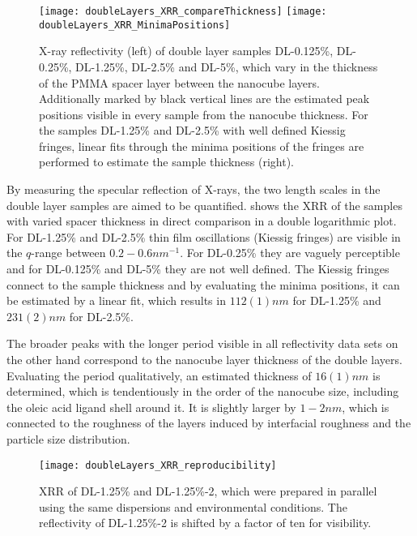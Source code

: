 \documentclass[\main/dresen_thesis.tex]{subfiles}
\begin{document}
  \label{sec:doublelayers:layers:pnr}
  \begin{figure}[tb]
    \centering
    \texttt{[image: doubleLayers\_XRR\_compareThickness]}
    \texttt{[image: doubleLayers\_XRR\_MinimaPositions]}
    \caption{\label{fig:doublelayers:xrr:thicknessComparison}X-ray reflectivity (left) of double layer samples DL-0.125\%, DL-0.25\%, DL-1.25\%, DL-2.5\% and DL-5\%, which vary in the thickness of the PMMA spacer layer between the nanocube layers. Additionally marked by black vertical lines are the estimated peak positions visible in every sample from the nanocube thickness. For the samples DL-1.25\% and DL-2.5\% with well defined Kiessig fringes, linear fits through the minima positions of the fringes are performed to estimate the sample thickness (right).}
  \end{figure}
  By measuring the specular reflection of X-rays, the two length scales in the double layer samples are aimed to be quantified.
   shows the XRR of the samples with varied spacer thickness in direct comparison in a double logarithmic plot.
  For DL-1.25\% and DL-2.5\% thin film oscillations (Kiessig fringes) are visible in the $q$-range between $0.2 - 0.6 \unit{nm^{-1}}$.
  For DL-0.25\% they are vaguely perceptible and for DL-0.125\% and DL-5\% they are not well defined.
  The Kiessig fringes connect to the sample thickness and by evaluating the minima positions, it can be estimated by a linear fit, which results in $112(1) \unit{nm}$ for DL-1.25\% and $231(2) \unit{nm}$ for DL-2.5\%.

  The broader peaks with the longer period visible in all reflectivity data sets on the other hand correspond to the nanocube layer thickness of the double layers.
  Evaluating the period qualitatively, an estimated thickness of $16(1) \unit{nm}$ is determined, which is tendentiously in the order of the nanocube size, including the oleic acid ligand shell around it.
  It is slightly larger by $1 - 2 \unit{nm}$, which is connected to the roughness of the layers induced by interfacial roughness and the particle size distribution.

  \begin{figure}[tb]
    \centering
    \texttt{[image: doubleLayers\_XRR\_reproducibility]}
    \caption{\label{fig:doublelayers:xrr:reproducibility}XRR of DL-1.25\% and DL-1.25\%-2, which were prepared in parallel using the same dispersions and environmental conditions. The reflectivity of DL-1.25\%-2 is shifted by a factor of ten for visibility.}
  \end{figure}
\end{document}
